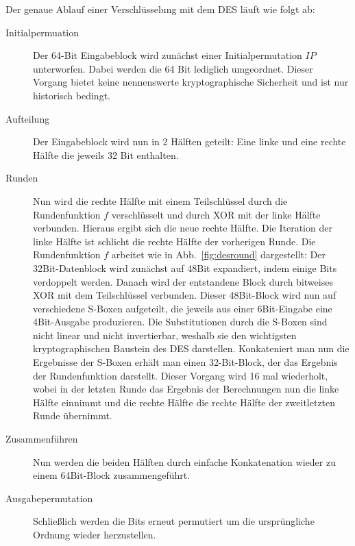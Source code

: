\clearpage
Der genaue Ablauf einer Verschlüsselung mit dem DES läuft wie folgt ab:
\begin{description}
	\item[Initialpermuation] Der 64-Bit Eingabeblock wird zunächst einer Initialpermutation $IP$ unterworfen. Dabei werden die 64 Bit lediglich umgeordnet. Dieser
	Vorgang bietet keine nennenswerte kryptographische Sicherheit und ist nur historisch bedingt.
	\item[Aufteilung] Der Eingabeblock wird nun in 2 Hälften geteilt: Eine linke und eine rechte Hälfte die jeweils 32 Bit enthalten.
	\item[Runden] Nun wird die rechte Hälfte mit einem Teilschlüssel durch die Rundenfunktion $f$ verschlüsselt und durch XOR mit der linke Hälfte verbunden.
	Hieraus ergibt sich die neue rechte Hälfte. Die Iteration der linke Hälfte ist schlicht die rechte Hälfte der vorherigen Runde. Die Rundenfunktion $f$
	arbeitet wie in Abb.~\ref{fig:desround} dargestellt: Der 32Bit-Datenblock wird zunächst auf 48Bit expandiert, indem einige Bits verdoppelt werden. Danach wird
	der entstandene Block durch bitweises XOR mit dem Teilschlüssel verbunden. Dieser 48Bit-Block wird nun auf verschiedene S-Boxen aufgeteilt, die jeweils aus
	einer 6Bit-Eingabe eine 4Bit-Ausgabe produzieren. Die Substitutionen durch die S-Boxen sind nicht linear und nicht invertierbar, weshalb sie den wichtigsten
	kryptographischen Baustein des DES darstellen. Konkateniert man nun die Ergebnisse der S-Boxen erhält man einen 32-Bit-Block, der das Ergebnis der
	Rundenfunktion darstellt. Dieser Vorgang wird 16 mal wiederholt, wobei in der letzten Runde das Ergebnis der Berechnungen nun die linke Hälfte einnimmt und
	die rechte Hälfte die rechte Hälfte der zweitletzten Runde übernimmt.
	\item[Zusammenführen] Nun werden die beiden Hälften durch einfache Konkatenation wieder zu einem 64Bit-Block zusammengeführt.
	\item[Ausgabepermutation] Schließlich werden die Bits erneut permutiert um die ursprüngliche Ordnung wieder herzustellen.
\end{description}

